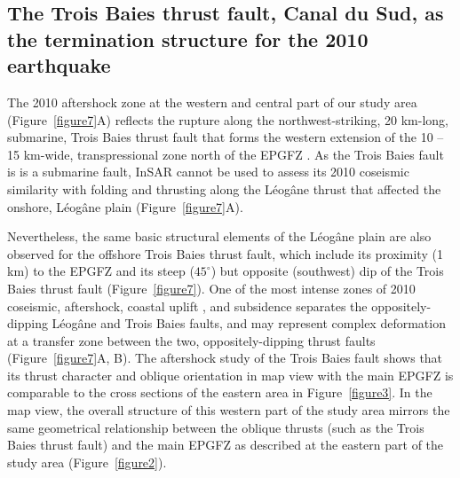 \documentclass[linenumbers,draft]{agujournal}
\begin{document}
\subsection{The Trois Baies thrust fault, Canal du Sud, as the termination structure for the 2010 earthquake}
The 2010 aftershock zone at the western and central part of our study area (Figure~\ref{figure7}A) reflects the rupture along the northwest-striking, 20 km-long, submarine, Trois Baies thrust fault that forms the western extension of the 10 -- 15 km-wide, transpressional zone north of the EPGFZ \citep{mercier20112010}. As the Trois Baies fault is is a submarine fault, InSAR cannot be used to assess its 2010 coseismic similarity with folding and thrusting along the L\'eog\^ane thrust that affected the onshore, L\'eog\^ane plain (Figure~\ref{figure7}A). 

Nevertheless, the same basic structural elements of the L\'eog\^ane plain are also observed for the offshore Trois Baies thrust fault, which include its proximity (1 km) to the EPGFZ and its steep ($45^{\circ}$) but opposite (southwest) dip of the Trois Baies thrust fault (Figure~\ref{figure7}). One of the most intense zones of 2010 coseismic, aftershock, coastal uplift \citep{hashimoto2011fan}, and subsidence \citep{prentice2010seismic} separates the oppositely-dipping L\'eog\^ane and Trois Baies faults, and may represent complex deformation at a transfer zone between the two, oppositely-dipping thrust faults (Figure~\ref{figure7}A, B). The aftershock study of the Trois Baies fault \citep{symithe2016present} shows that its thrust character and oblique orientation in map view with the main EPGFZ is comparable to the cross sections of the eastern area in Figure~\ref{figure3}. In the map view, the overall structure of this western part of the study area mirrors the same geometrical relationship between the oblique thrusts (such as the Trois Baies thrust fault) and the main EPGFZ as described at the eastern part of the study area (Figure~\ref{figure2}).
\end{document}
